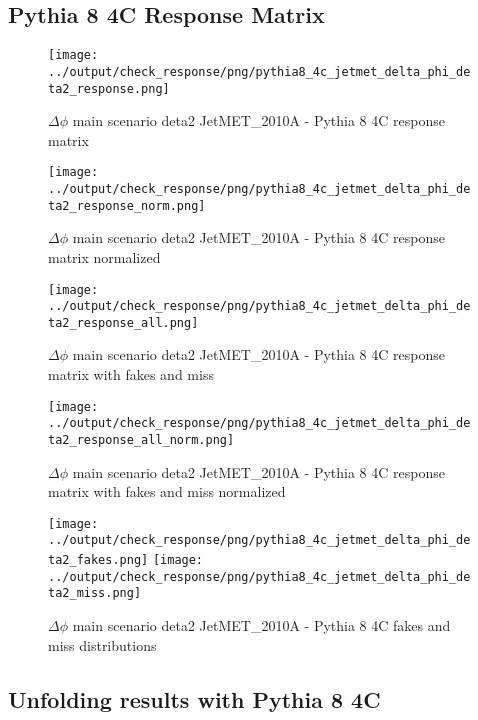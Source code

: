 \documentclass[11pt]{book}
\begin{document}
\clearpage
\subsection{Pythia 8 4C Response Matrix}


\begin{figure}[ht]
\centering
\texttt{[image: ../output/check\_response/png/pythia8\_4c\_jetmet\_delta\_phi\_deta2\_response.png]}
\caption{$\Delta\phi$ main scenario deta2 JetMET\_2010A - Pythia 8 4C response matrix}
\label{p8_jetmet_delta_phi_deta2_response}
\end{figure}

\begin{figure}[ht]
\centering
\texttt{[image: ../output/check\_response/png/pythia8\_4c\_jetmet\_delta\_phi\_deta2\_response\_norm.png]}
\caption{$\Delta\phi$ main scenario deta2 JetMET\_2010A - Pythia 8 4C response matrix normalized}
\label{p8_jetmet_delta_phi_deta2_response_norm}
\end{figure}

\begin{figure}[ht]
\centering
\texttt{[image: ../output/check\_response/png/pythia8\_4c\_jetmet\_delta\_phi\_deta2\_response\_all.png]}
\caption{$\Delta\phi$ main scenario deta2 JetMET\_2010A - Pythia 8 4C response matrix with fakes and miss}
\label{p8_jetmet_delta_phi_deta2_response_all}
\end{figure}

\begin{figure}[ht]
\centering
\texttt{[image: ../output/check\_response/png/pythia8\_4c\_jetmet\_delta\_phi\_deta2\_response\_all\_norm.png]}
\caption{$\Delta\phi$ main scenario deta2 JetMET\_2010A - Pythia 8 4C response matrix with fakes and miss normalized}
\label{p8_jetmet_delta_phi_deta2_response_all_norm}
\end{figure}

\begin{figure}[ht]
\centering
\texttt{[image: ../output/check\_response/png/pythia8\_4c\_jetmet\_delta\_phi\_deta2\_fakes.png]}
\texttt{[image: ../output/check\_response/png/pythia8\_4c\_jetmet\_delta\_phi\_deta2\_miss.png]}
\caption{$\Delta\phi$ main scenario deta2 JetMET\_2010A - Pythia 8 4C fakes and miss distributions}
\label{p8_jetmet_delta_phi_deta2_fakesmiss}
\end{figure}


\clearpage
\subsection{Unfolding results with Pythia 8 4C}
\end{document}
